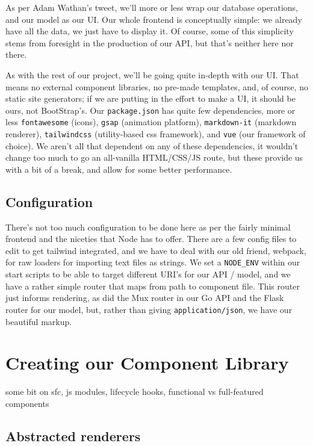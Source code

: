 \documentclass[11pt, twoside, reqno]{book}
\begin{document}
As per Adam Wathan's tweet, we'll more or less wrap our database operations, and our model as our UI. Our whole frontend is conceptually simple: we already have all the data, we just have to display it. Of course, some of this simplicity stems from foresight in the production of our API, but that's neither here nor there.

As with the rest of our project, we'll be going quite in-depth with our UI. That means no external component libraries, no pre-made templates, and, of course, no static site generators; if we are putting in the effort to make a UI, it should be ours, not BootStrap's. Our \texttt{package.json} has quite few dependencies, more or less \texttt{fontawesome} (icons), \texttt{gsap} (animation platform), \texttt{markdown-it} (markdown renderer), \texttt{tailwindcss} (utility-based css framework), and \texttt{vue} (our framework of choice). We aren't all that dependent on any of these dependencies, it wouldn't change too much to go an all-vanilla HTML/CSS/JS route, but these provide us with a bit of a break, and allow for some better performance.

\subsection{Configuration}

There's not too much configuration to be done here as per the fairly minimal frontend and the niceties that Node has to offer. There are a few config files to edit to get tailwind integrated, and we have to deal with our old friend, webpack, for raw loaders for importing text files as strings. We set a \texttt{NODE\_ENV} within our start scripts to be able to target different URI's for our API / model, and we have a rather simple router that maps from path to component file. This router just informs rendering, as did the Mux router in our Go API and the Flask router for our model, but, rather than giving \texttt{application/json}, we have our beautiful markup.

\section{Creating our Component Library}

some bit on sfc, js modules, lifecycle hooks, functional vs full-featured components

\subsection{Abstracted renderers}
\end{document}
